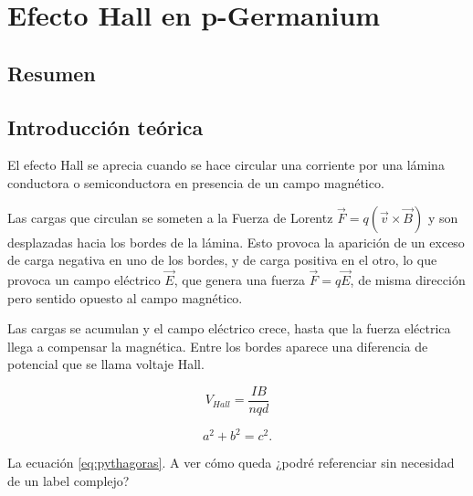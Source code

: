 




\chapter{Efecto Hall en p-Germanium}

\section{Resumen}




\section{Introducción teórica}

\iffalse
En la primera parte de la memoria (en su introducción), y con el objetivo de comprender teóricamente el fenómeno que vamos a estudiar, deberá exponer los fundamentos en los que se basa la práctica. No se trata de copiar únicamente lo que pone en este guión, sino de resumirlo y profundizar un poco más en algún aspecto, pero sin ser extenso.
\fi


\vspace{3\baselineskip}

El efecto Hall se aprecia cuando se hace circular una corriente por una lámina conductora o semiconductora en presencia de un campo magnético. 

Las cargas que circulan se someten a la Fuerza de Lorentz $\vec{F} = q(\vec{v} \times \vec{B})$ y son desplazadas hacia los bordes de la lámina. Esto provoca la aparición de un exceso de carga negativa en uno de los bordes, y de carga positiva en el otro, lo que provoca un campo eléctrico $\vec{E}$, que genera una fuerza $\vec{F}= q \vec{E}$, de misma dirección pero sentido opuesto al campo magnético. 

Las cargas se acumulan y el campo eléctrico crece, hasta que la fuerza eléctrica llega a compensar la magnética. 
Entre los bordes aparece una diferencia de potencial que se llama voltaje Hall.

\begin{equation} \label{eq:vhall}
V_{Hall} = \frac{I B}{nqd}
\end{equation}


\iffalse
\begin{equation}\label{eq:pythagoras}
a^2 + b^2 = c^2 .
\end{equation}


La ecuación \eqref{eq:pythagoras}. A ver cómo queda ¿podré referenciar sin necesidad de un label complejo?

